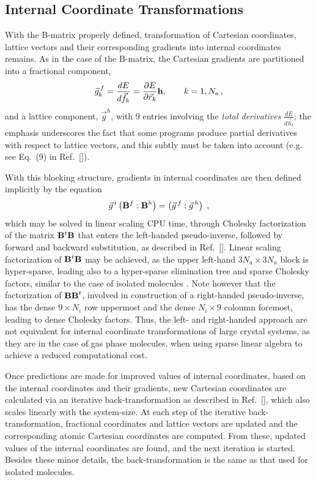 \twolinestyle{\documentclass[prb,preprint]{revtex4}}
\begin{document}
\subsection{Internal Coordinate Transformations}

With the B-matrix properly defined, transformation of Cartesian coordinates, lattice vectors  and their 
corresponding gradients into internal coordinates remains.  As in the case of the B-matrix, the 
Cartesian gradients are partitioned into a fractional component,
\begin{equation}
\vec{g}^{\,f}_k = \frac{d E}{d \vec{f}_{k}} 
= \frac{\partial E}{\partial \vec{r}_{k}} {\bf h}, \qquad k=1,N_a \, ,
\end{equation}
and a lattice component, $\vec{g}^h$, with 9 entries involving the {\em total derivatives}
$\frac{d E}{d \vec{h}_{l}}$; the emphasis underscores the fact that some
programs produce partial derivatives with respect to lattice vectors, and this subtly
must be taken into account (e.g. see Eq.~(9) in Ref.~[]).  

With this blocking structure, gradients in internal coordinates are then defined implicitly by the equation
\begin{equation}
\vec{g}^{\, i} \left( {\bf B}^f : {\bf B}^h \right)= \left(\vec{g}^{\, f} : \vec{g}^{\, h} \right) \;, 
\end{equation}
which  may be solved in linear scaling CPU time, through Cholesky factorization of the 
matrix ${\bf B}^{t} {\bf B}$ that enters the left-handed pseudo-inverse, 
followed by forward and backward substitution, as described in Ref.~[].  
Linear scaling factorization of ${\bf B}^t \bf B$ may be achieved, as the upper left-hand 
$3 N_a \times 3 N_a$ block is hyper-sparse, leading also to a hyper-sparse elimination tree
and sparse Cholesky factors, similar to the case of isolated molecules \cite{KNemeth01}.
Note however that the factorization of ${\bf B B}^{t}$, involved in construction of a right-handed 
pseudo-inverse, has the dense $9 \times N_i$ row uppermost and the dense $N_i \times 9$ coloumn foremost,
leading to dense Cholesky factors. Thus, the left- and right-handed approach  are not equivalent for 
internal coordinate transformations of large crystal systems, as they are in the case of
gas phase molecules, when using sparse linear algebra to achieve a reduced computational cost.

Once predictions are made for improved values of internal coordinates,
based on the internal coordinates and their gradients, new Cartesian coordinates are 
calculated via an iterative back-transformation as described in Ref.~[], 
which also scales linearly with the system-size. At each step of the iterative back-transformation, 
fractional coordinates 
and lattice vectors are updated and the corresponding atomic Cartesian coordinates are
computed.  From these, updated values of the internal coordinates are found, and
the next iteration is started.  Besides these minor details, the back-transformation
is the same as that used for isolated molecules.
\end{document}
